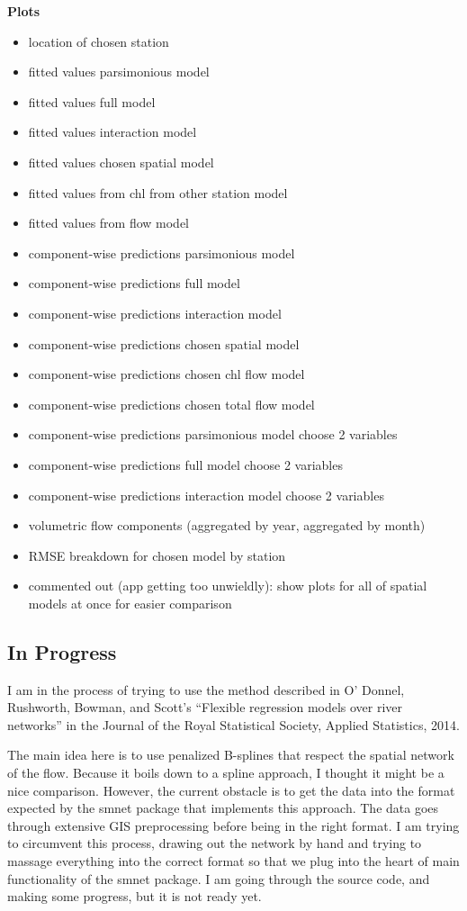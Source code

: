 \documentclass[12pt]{amsart}
\begin{document}
\textbf{Plots}
\begin{itemize}
\item location of chosen station
\item fitted values parsimonious model
\item fitted values full model
\item fitted values interaction model
\item fitted values chosen spatial model
\item fitted values from chl from other station model
\item fitted values from flow model
\item component-wise predictions parsimonious model
\item component-wise predictions full model
\item component-wise predictions interaction model
\item component-wise predictions chosen spatial model
\item component-wise predictions chosen chl flow model
\item component-wise predictions chosen total flow model
\item component-wise predictions parsimonious model choose 2 variables
\item component-wise predictions full model choose 2 variables
\item component-wise predictions interaction model choose 2 variables
\item volumetric flow components (aggregated by year, aggregated by month)
\item RMSE breakdown for chosen model by station
\item commented out (app getting too unwieldly): show plots for all of spatial models at once for easier comparison
\end{itemize}

\subsection{In Progress}

I am in the process of trying to use the method described in  O' Donnel, Rushworth, Bowman, and Scott's ``Flexible regression models over river networks'' in the Journal of the Royal Statistical Society, Applied Statistics, 2014.

The main idea here is to use penalized B-splines that respect the spatial network of the flow. Because it boils down to a spline approach, I thought it might be a nice comparison. However, the current obstacle is to get the data into the format expected by the smnet package that implements this approach. The data goes through extensive GIS preprocessing before being in the right format. I am trying to circumvent this process, drawing out the network by hand and trying to massage everything into the correct format so that we plug into the heart of main functionality of the smnet package. I am going through the source code, and making some progress, but it is not ready yet.
\end{document}
